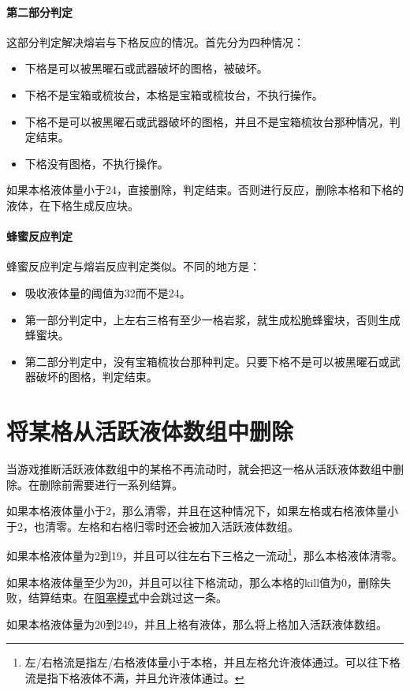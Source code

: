 \paragraph*{第二部分判定}
这部分判定解决熔岩与下格反应的情况。首先分为四种情况：
\begin{itemize}
    \item 下格是可以被黑曜石或武器破坏的图格，被破坏。
    \item 下格不是宝箱或梳妆台，本格是宝箱或梳妆台，不执行操作。
    \item 下格不是可以被黑曜石或武器破坏的图格，并且不是宝箱梳妆台那种情况，判定结束。
    \item 下格没有图格，不执行操作。
\end{itemize}
如果本格液体量小于24，直接删除，判定结束。否则进行反应，删除本格和下格的液体，在下格生成反应块。

\paragraph*{蜂蜜反应判定}\label{app25}
蜂蜜反应判定与熔岩反应判定类似。不同的地方是：
\begin{itemize}
    \item 吸收液体量的阈值为32而不是24。
    \item 第一部分判定中，上左右三格有至少一格岩浆，就生成松脆蜂蜜块，否则生成蜂蜜块。
    \item 第二部分判定中，没有宝箱梳妆台那种判定。只要下格不是可以被黑曜石或武器破坏的图格，判定结束。
\end{itemize}

\section{将某格从活跃液体数组中删除}\label{app28}
当游戏推断活跃液体数组中的某格不再流动时，就会把这一格从活跃液体数组中删除。在删除前需要进行一系列结算。

如果本格液体量小于2，那么清零，并且在这种情况下，如果左格或右格液体量小于2，也清零。左格和右格归零时还会被加入活跃液体数组。

如果本格液体量为2到19，并且可以往左右下三格之一流动\footnote{左/右格流是指左/右格液体量小于本格，并且左格允许液体通过。可以往下格流是指下格液体不满，并且允许液体通过。}，那么本格液体清零。

如果本格液体量至少为20，并且可以往下格流动，那么本格的kill值为0，删除失败，结算结束。在\hyperref[app29]{阻塞模式}中会跳过这一条。

如果本格液体量为20到249，并且上格有液体，那么将上格加入活跃液体数组。


